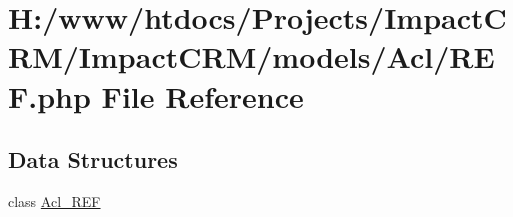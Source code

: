 \hypertarget{REF_8php}{
\section{H:/www/htdocs/Projects/ImpactCRM/ImpactCRM/models/Acl/REF.php File Reference}
\label{REF_8php}
}
\subsection*{Data Structures}
\begin{DoxyCompactItemize}
\item 
class \hyperlink{classAcl__REF}{Acl\_\-REF}
\end{DoxyCompactItemize}
